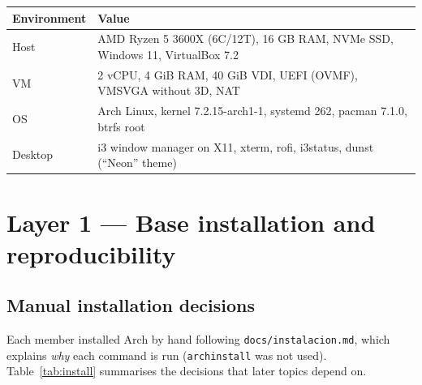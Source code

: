 \documentclass[10.5pt,a4paper]{article}
\newcommand{\cmd}[1]{\texttt{#1}}
\begin{document}
\vspace{4pt}
\noindent\begin{tabularx}{\linewidth}{@{}lL@{}}
\toprule
\textbf{Environment} & \textbf{Value}\\ \midrule
Host & AMD Ryzen 5 3600X (6C/12T), 16 GB RAM, NVMe SSD, Windows 11, VirtualBox 7.2\\
VM & 2 vCPU, 4 GiB RAM, 40 GiB VDI, UEFI (OVMF), VMSVGA without 3D, NAT\\
OS & Arch Linux, kernel 7.2.15-arch1-1, systemd 262, pacman 7.1.0, btrfs root\\
Desktop & i3 window manager on X11, xterm, rofi, i3status, dunst (``Neon'' theme)\\
\bottomrule
\end{tabularx}

\tableofcontents
\newpage

\section{Layer 1 — Base installation and reproducibility}

\subsection{Manual installation decisions}
Each member installed Arch by hand following \cmd{docs/instalacion.md}, which explains \emph{why} each command is run (\cmd{archinstall} was not used). Table~\ref{tab:install} summarises the decisions that later topics depend on.
\end{document}
